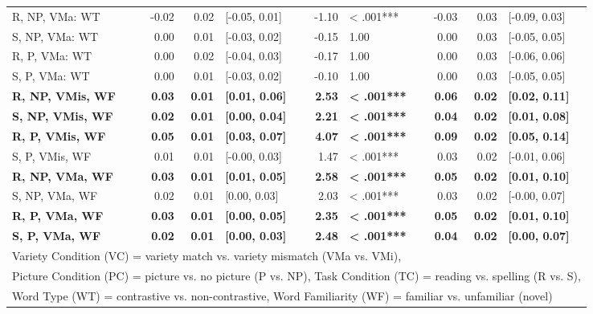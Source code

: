 \documentclass[doc,floatsintext]{apa6}
\begin{document}
\begin{table}[!h]
{\begin{tabular}{lrrlrlrrl}
R, NP, VMa: WT & -0.02 & 0.02 & [-0.05, 0.01] & -1.10 & < .001*** & -0.03 & 0.03 & [-0.09, 0.03]\\
S, NP, VMa: WT & 0.00 & 0.01 & [-0.03, 0.02] & -0.15 & 1.00 & 0.00 & 0.03 & [-0.05, 0.05]\\
R, P, VMa: WT & 0.00 & 0.02 & [-0.04, 0.03] & -0.17 & 1.00 & 0.00 & 0.03 & [-0.06, 0.06]\\
S, P, VMa: WT & 0.00 & 0.01 & [-0.03, 0.02] & -0.10 & 1.00 & 0.00 & 0.03 & [-0.05, 0.05]\\
\textbf{R, NP, VMis, WF} & \textbf{0.03} & \textbf{0.01} & \textbf{[0.01, 0.06]} & \textbf{2.53} & \textbf{< .001***} & \textbf{0.06} & \textbf{0.02} & \textbf{[0.02, 0.11]}\\
\textbf{S, NP, VMis, WF} & \textbf{0.02} & \textbf{0.01} & \textbf{[0.00, 0.04]} & \textbf{2.21} & \textbf{< .001***} & \textbf{0.04} & \textbf{0.02} & \textbf{[0.01, 0.08]}\\
\textbf{R, P, VMis, WF} & \textbf{0.05} & \textbf{0.01} & \textbf{[0.03, 0.07]} & \textbf{4.07} & \textbf{< .001***} & \textbf{0.09} & \textbf{0.02} & \textbf{[0.05, 0.14]}\\
S, P, VMis, WF & 0.01 & 0.01 & [-0.00, 0.03] & 1.47 & < .001*** & 0.03 & 0.02 & [-0.01, 0.06]\\
\textbf{R, NP, VMa, WF} & \textbf{0.03} & \textbf{0.01} & \textbf{[0.01, 0.05]} & \textbf{2.58} & \textbf{< .001***} & \textbf{0.05} & \textbf{0.02} & \textbf{[0.01, 0.10]}\\
S, NP, VMa, WF & 0.02 & 0.01 & [0.00, 0.03] & 2.03 & < .001*** & 0.03 & 0.02 & [-0.00, 0.07]\\
\textbf{R, P, VMa, WF} & \textbf{0.03} & \textbf{0.01} & \textbf{[0.00, 0.05]} & \textbf{2.35} & \textbf{< .001***} & \textbf{0.05} & \textbf{0.02} & \textbf{[0.01, 0.10]}\\
\textbf{S, P, VMa, WF} & \textbf{0.02} & \textbf{0.01} & \textbf{[0.00, 0.03]} & \textbf{2.48} & \textbf{< .001***} & \textbf{0.04} & \textbf{0.02} & \textbf{[0.00, 0.07]}\\
\bottomrule
\multicolumn{9}{l}{Variety Condition (VC) = variety match vs. variety mismatch (VMa vs. VMi),}\\
\multicolumn{9}{l}{Picture Condition (PC) = picture vs. no picture (P vs. NP), Task Condition (TC) = reading vs. spelling (R vs. S),}\\
\multicolumn{9}{l}{Word Type (WT) = contrastive vs. non-contrastive, Word Familiarity (WF) = familiar vs. unfamiliar (novel)}\\
\end{tabular}}
\end{table}
\end{document}
